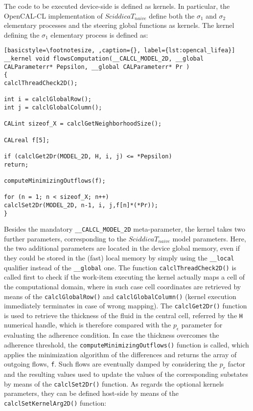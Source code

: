 The code to be executed device-side is defined as kernels. In
particular, the OpenCAL-CL implementation of $SciddicaT_{naive}$
define both the $\sigma_1$ and $\sigma_2$ elementary processes and
the steering global functions as kernels. The kernel defining the
$\sigma_1$ elementary process is defined as:
\begin{lstlisting}[basicstyle=\footnotesize, ,caption={}, label={lst:opencal_lifea}]
__kernel void flowsComputation(__CALCL_MODEL_2D, __global CALParameterr* Pepsilon, __global CALParameterr* Pr )
{
calclThreadCheck2D();

int i = calclGlobalRow();
int j = calclGlobalColumn();

CALint sizeof_X = calclGetNeighborhoodSize();

CALreal f[5];

if (calclGet2Dr(MODEL_2D, H, i, j) <= *Pepsilon)
return;

computeMinimizingOutflows(f);

for (n = 1; n < sizeof_X; n++)
calclSet2Dr(MODEL_2D, n-1, i, j,f[n]*(*Pr));
}
\end{lstlisting}

\noindent Besides the mandatory \verb'__CALCL_MODEL_2D'
meta-parameter, the kernel takes two further parameters,
corresponding to the $SciddicaT_{naive}$ model parameters. Here, the
two additional parameters are located in the device global memory,
even if they could be stored in the (fast) local memory by simply
using the \verb'__local' qualifier instead of the \verb'__global'
one. The function \verb'calclThreadCheck2D()' is called first to
check if the work-item executing the kernel actually maps a cell of
the computational domain, where in such case cell coordinates are
retrieved by means of the \verb'calclGlobalRow()' and
\verb'calclGlobalColumn()' (kernel execution immediately terminates
in case of wrong mapping). The \verb'calclGet2Dr()' function is used
to retrieve the thickness of the fluid in the central cell, referred
by the \verb'H' numerical handle, which is therefore compared with
the $p_\epsilon$ parameter for evaluating the adherence
condition. In case the thickness overcomes the adherence threshold,
the \verb'computeMinimizingOutflows()' function is called, which
applies the minimization algorithm of the differences and returns
the array of outgoing flows, \verb'f'. Such flows are eventually
damped by considering the $p_r$ factor and the resulting values used
to update the values of the corresponding substates by means of the
\verb'calclSet2Dr()' function. As regards the optional kernels
parameters, they can be defined host-side by means of the
\verb'calclSetKernelArg2D()' function:

